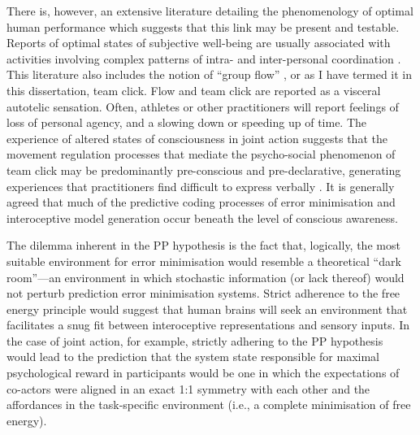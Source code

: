 There is, however, an extensive literature detailing the phenomenology of optimal human performance which suggests that this link may be present and testable.  Reports of optimal states of subjective well-being are usually associated with activities involving complex patterns of intra- and inter-personal coordination \citep{Jackson1996}. This literature also includes the notion of ``group flow'' \citep{Sawyer2006,Noy2015}, or as I have termed it in this dissertation, team click.  Flow and team click are reported as a visceral autotelic sensation.  Often, athletes or other practitioners will report feelings of loss of personal agency, and a slowing down or speeding up of time.  The experience of altered states of consciousness in joint action suggests that the movement regulation processes that mediate the psycho-social phenomenon of team click may be predominantly pre-conscious and pre-declarative, generating experiences that practitioners find  difficult to express verbally \citep{Jackson1996,Semin2008,Rufi2015}. It is generally agreed that much of the predictive coding processes of error minimisation and interoceptive model generation occur beneath the level of conscious awareness\citep{Frith2007,Clark2013}.


The dilemma inherent in the PP hypothesis is the fact that, logically, the most suitable environment for error minimisation would resemble a theoretical ``dark room''---an environment in which stochastic information (or lack thereof) would not perturb prediction error minimisation systems\citep{Little2013}.  Strict adherence to the free energy principle would suggest that human brains will seek an environment that facilitates a snug fit between interoceptive representations and sensory inputs.  In the case of joint action, for example, strictly adhering to the PP hypothesis would lead to the prediction that the system state responsible for maximal psychological reward in participants would be one in which the expectations of co-actors were aligned in an exact 1:1 symmetry with each other and the affordances in the task-specific environment (i.e., a complete minimisation of free energy).

